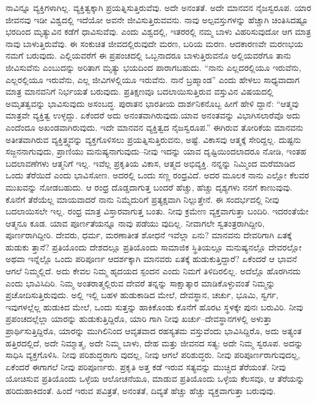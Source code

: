ನಾವಿನ್ನೂ ವ್ಯಕ್ತಿಗಳಾಗಿಲ್ಲ. ವ್ಯಕ್ತಿತ್ವಕ್ಕಾಗಿ ಪ್ರಯತ್ನಿಸುತ್ತಿರುವೆವು. ಅದೇ ಅನಂತತೆ. ಅದೇ ಮಾನವನ ನೈಜಸ್ವರೂಪ. ಯಾರ ಜೀವನವು ಇಡೀ ವಿಶ್ವದಲ್ಲಿ ಇದೆಯೋ ಅವನೇ ಜೀವಿಸುತ್ತಿರುವವನು. ನಾವು ಅಲ್ಪವಸ್ತುಗಳನ್ನು ಹೆಚ್ಚಾಗಿ ಚಿಂತಿಸಿದಷ್ಟೂ ಭರದಿಂದ ಮೃತ್ಯುವಿನ ಕಡೆಗೆ ಧಾವಿಸುವೆವು. ಎಂದು ವಿಶ್ವದಲ್ಲಿ, ಇತರರಲ್ಲಿ ನಮ್ಮ ಬಾಳು ವಿಹರಿಸುವುದೋ ಆಗ ಮಾತ್ರ ನಾವು ಬಾಳುತ್ತಿರುವೆವು. ಈ ಸಂಕುಚಿತ ಜೀವದಲ್ಲಿರುವುದೇ ಮರಣ, ಬರಿಯ ಮರಣ. ಆದಕಾರಣವೇ ಮರಣಭಯ ನಮಗೆ ಬರುವುದು. ಎಲ್ಲಿಯವರೆಗೆ ಈ ಪ್ರಪಂಚದಲ್ಲಿ ಒಬ್ಬನಾದರೂ ಬಾಳುತ್ತಿರುವನೊ ಅಲ್ಲಿಯವರೆಗೂ ತಾನು ಜೀವಿಸುವೆನು ಎಂಬುದನ್ನು ಅರಿತಾಗ ಮೃತ್ಯು ಭಯದಿಂದ ಪಾರಾಗಬಹುದು. “ನಾನು ಎಲ್ಲದರಲ್ಲಿಯೂ ಇರುವೆನು, ಎಲ್ಲರಲ್ಲಿಯೂ ಇರುವೆನು, ಎಲ್ಲ ಜೀವಿಗಳಲ್ಲಿಯೂ ಇರುವೆನು. ನಾನೆ ಬ್ರಹ್ಮಾಂಡ” ಎಂದು ಹೇಳಲು ಸಾಧ್ಯವಾದಾಗ ಮಾತ್ರ ಮಾನವನಿಗೆ ನಿರ್ಭಯತೆ ಬರುವುದು. ಪ್ರತಿಕ್ಷಣವೂ ಬದಲಾಯಿಸುತ್ತಿರುವ ವಸ್ತುವಿನ ವಿಷಯದಲ್ಲಿ ಅಮೃತತ್ವವನ್ನು ಭಾವಿಸುವುದು ಅಸಂಬದ್ಧ. ಪುರಾತನ ಭಾರತೀಯ ದಾರ್ಶನಿಕನೊಬ್ಬ ಹೀಗೆ ಹೇಳಿ ದ್ದಾನೆ: “ಆತ್ಮವು ಮಾತ್ರವೇ ವ್ಯಕ್ತಿತ್ವ ಉಳ್ಳದ್ದು. ಏಕೆಂದರೆ ಅದು ಅನಂತವಾಗಿರುವುದು.ಯಾವ ಅನಂತವನ್ನು ವಿಭಾಗಿಸಲಾರೆವೊ ಅದು ಎಂದೆಂದೂ ಅಖಂಡವಾಗಿರುವುದು. ಇದೇ ಮಾನವನ ವ್ಯಕ್ತಿತ್ವದ ನೈಜಸ್ವರೂಪ.” ಈಗಿರುವ ತೋರಿಕೆಯ ಮಾನವನು ಅತೀತವಾಗಿರುವ ವ್ಯಕ್ತಿತ್ತ್ವವನ್ನು ವ್ಯಕ್ತಗೊಳಿಸಲು ಪ್ರಯತ್ನಿಸುತ್ತಿರುವನು, ಅಷ್ಟೆ. ವಿಕಾಸವು ಆತ್ಮಕ್ಕೆ ಸೇರಿದ್ದಲ್ಲ. ದುಷ್ಟನು ಸಜ್ಜನನಾಗುವುದು, ಪ್ರಾಣಿಯು ಮನುಷ್ಯನಾಗುವುದು–ನೀವು ಇದನ್ನು ಯಾವ ದೃಷ್ಟಿಯಿಂದಲಾದರೂ ನೋಡಿ, ಇಂತಹ ಬದಲಾವಣೆಗಳು ಆತ್ಮನಿಗೆ ಇಲ್ಲ. ಇವೆಲ್ಲ ಪ್ರಕೃತಿಯ ವಿಕಾಸ, ಆತ್ಮದ ಅಭಿವ್ಯಕ್ತಿ. ನನ್ನನ್ನು ನಿಮ್ಮಿಂದ ಮರೆಮಾಡಿದ ಒಂದು ತೆರೆಯಿದೆ ಎಂದು ಭಾವಿಸೋಣ. ಅದರಲ್ಲಿ ಒಂದು ಸಣ್ಣ ರಂಧ್ರವಿದೆ. ಅದರ ಮೂಲಕ ನಾನು ಎಲ್ಲೋ ಕೆಲವರ ಮುಖವನ್ನು ನೋಡಬಹುದು. ಆ ರಂಧ್ರ ದೊಡ್ಡದಾಗುತ್ತ ಬಂದರೆ ಹೆಚ್ಚು, ಹೆಚ್ಚು ದೃಶ್ಯಗಳು ನನಗೆ ಕಾಣುವುವು. ಕೊನೆಗೆ ತೆರೆಯೆಲ್ಲ ಮಾಯವಾದರೆ ನಾನು ನಿಮ್ಮೆದುರಿಗೆ ಪ್ರತ್ಯಕ್ಷವಾಗಿ ನಿಲ್ಲುತ್ತೇನೆ. ಈ ಸಂದರ್ಭದಲ್ಲಿ ನೀವು ಬದಲಾಯಿಸಲೇ ಇಲ್ಲ. ರಂಧ್ರ ಮಾತ್ರ ವಿಸ್ತಾರವಾಗುತ್ತ ಬಂತು. ನೀವು ಕ್ರಮೇಣ ವ್ಯಕ್ತವಾಗುತ್ತಾ ಬಂದಿರಿ. ಇದರಂತೆಯೇ ಆತ್ಮನೂ ಕೂಡ. ಯಾವ ಪೂರ್ಣತೆಯನ್ನೂ ನಾವು ಪಡೆಯು ವುದಿಲ್ಲ. ನೀವಾಗಲೇ ಸ್ವತಂತ್ರರಾಗಿದ್ದೀರಿ, ಪೂರ್ಣರಾಗಿದ್ದೀರಿ. ದೇವರು, ಧರ್ಮ, ಮರಣಾತೀತ ಶೋಧನೆ ಇವೆಲ್ಲಾ ಏನು? ಮಾನವನು ದೇವರಿಗಾಗಿ ಏತಕ್ಕೆ ಹುಡುಕು ತ್ತಾನೆ? ಪ್ರತಿಯೊಂದು ದೇಶದಲ್ಲೂ ಪ್ರತಿಯೊಂದು ಸಾಮಾಜಿಕ ಸ್ಥಿತಿಯಲ್ಲೂ ಮನುಷ್ಯನಲ್ಲೊ ದೇವರಲ್ಲೋ ಅಥವಾ ಇನ್ನೆಲ್ಲೊ ಒಂದು ಪರಿಪೂರ್ಣ ಆದರ್ಶಕ್ಕಾಗಿ ಮಾನವರು ಏತಕ್ಕೆ ಹುಡುಕುತ್ತಿದ್ದಾರೆ? ಏಕೆಂದರೆ ಆ ಭಾವನೆ ಆಗಲೆ ನಿಮ್ಮಲ್ಲಿದೆ. ಅದು ಕೇವಲ ನಿಮ್ಮ ಹೃದಯದ ಸ್ಪಂದನ ಎಂದು ನಿಮಗೆ ತಿಳಿದಿರಲಿಲ್ಲ. ಅದೆಲ್ಲೊ ಹೊರಗಿನದು ಎಂದು ಭಾವಿಸಿದಿರಿ. ನಿಮ್ಮ ಅಂತರಾತ್ಮಲ್ಲಿರುವ ದೇವರೆ ತನ್ನನ್ನು ಸಾಕ್ಷಾತ್ಕಾರ ಮಾಡಿಕೊಳ್ಳುವಂತೆ ನಿಮ್ಮನ್ನು ಪ್ರಚೋದಿಸುತ್ತಿರುವುದು. ಅಲ್ಲಿ ಇಲ್ಲಿ ಬಹಳ ಹುಡುಕಾಡಿದ ಮೇಲೆ, ದೇವಸ್ಥಾನ, ಚರ್ಚು, ಭೂಮಿ, ಸ್ವರ್ಗ, ಇವುಗಳಲ್ಲೆಲ್ಲ ಹುಡುಕಿದ ಮೇಲೆ, ಒಂದು ಸುತ್ತನ್ನು ಹಾಕಿಕೊಂಡು ಕೊನೆಗೆ ಹೊರಟ ಸ್ಥಳಕ್ಕೇ ಪುನಃ ಬರುವಿರಿ. ನೀವು ಪ್ರಪಂಚದಲ್ಲೆಲ್ಲಾ ಯಾರನ್ನು ಹುಡುಕುತ್ತಿದ್ದಿರೊ, ಯಾರಿ ಗಾಗಿ ನೀವು ಖರ್ಚು–ದೇವಸ್ಥಾನಗಳಲ್ಲಿ ಅಳುತ್ತಾ ಪ್ರಾರ್ಥಿಸುತ್ತಿದ್ದಿರೊ, ಯಾರನ್ನು ಮುಗಿಲಿನಿಂದ ಆವೃತವಾದ ರಹಸ್ಯತಮ ವಸ್ತುವೆಂದು ಭಾವಿಸಿದ್ದಿರೊ, ಅದು ಅತ್ಯಂತ ಹತ್ತಿರದಲ್ಲಿದೆ, ಅದೇ ನಿಮ್ಮಾತ್ಮ, ಅದೇ ನಿಮ್ಮ ಬಾಳು, ದೇಹ ಮತ್ತು ಜೀವನದ ಸತ್ಯ; ಅದೇ ನಿಮ್ಮ ಸ್ವರೂಪ. ಅದನ್ನು ಸಾಧಿಸಿ ವ್ಯಕ್ತಗೊಳಿಸಿ. ನೀವು ಪರಿಶುದ್ಧರಾಗು ವುದಲ್ಲ, ನೀವು ಆಗಲೆ ಪರಿಶುದ್ಧರು. ನೀವು ಪರಿಪೂರ್ಣರಾಗುವುದಲ್ಲ, ಏಕೆಂದರೆ ಈಗಾಗಲೆ ನೀವು ಪರಿಪೂರ್ಣರು. ಪ್ರಕೃತಿ ಅತ್ತ ಕಡೆ ಇರುವ ಸತ್ಯವನ್ನು ಮುಚ್ಚಿದ ತೆರೆಯಂತೆ. ನೀವು ಯೋಚಿಸುವ ಪ್ರತಿಯೊಂದು ಒಳ್ಳೆಯ ಆಲೋಚನೆಯೂ, ಮಾಡುವ ಪ್ರತಿಯೊಂದು ಒಳ್ಳೆಯ ಕೆಲಸವೂ, ಆ ತೆರೆಯನ್ನು ಹರಿದುಹಾಕಿದಂತೆ. ಹಿಂದೆ ಇರುವ ಪವಿತ್ರತೆ, ಅನಂತತೆ, ದಿವ್ಯತೆ ಹೆಚ್ಚು ಹೆಚ್ಚು ವ್ಯಕ್ತವಾಗುತ್ತಾ ಬರುವುವು.

